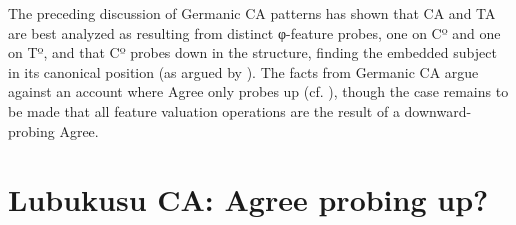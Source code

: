 \documentclass[output=paper
,modfonts
,nonflat
]{langsci/langscibook}
\begin{document}








The preceding discussion of Germanic CA patterns has shown that CA and TA are best analyzed as resulting from distinct φ-feature probes, one on Cº and one on Tº, and that Cº probes down in the structure, finding the embedded subject in its canonical position (as argued by \citealt{Carstens:2003,vanKoppen:2005,Haegeman:2012}). The facts from Germanic CA argue against an account where Agree only probes up (cf. \citealt{Zeijlstra:2012,Wurmbrand:2011,Bjorkman:toappearb}), though the case remains to be made that all feature valuation operations are the result of a downward-probing Agree. 

\section{Lubukusu CA: Agree probing up?} \label{LubukusuCA}
\end{document}
